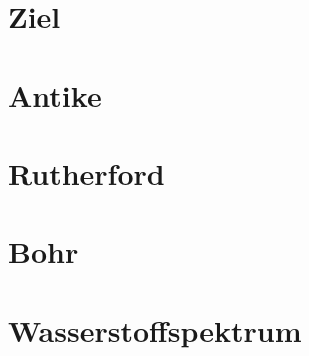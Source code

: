 \section{Ziel}


\section{Antike}


\section{Rutherford}


\section{Bohr}


\section{Wasserstoffspektrum}

